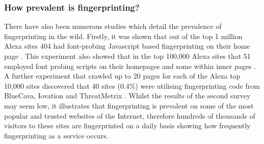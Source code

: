 \documentclass[12pt]{article}
\begin{document}
\subsubsection{How prevalent is fingerprinting?}
There have also been numerous studies which detail the prevalence of fingerprinting in the wild. Firstly, it was shown that out of the top 1 million Alexa sites 404 had font-probing Javascript based fingerprinting on their home page \parencite{dustingFP}. This experiment also showed that in the top 100,000 Alexa sites that 51 employed font probing scripts on their homepages and some within inner pages \parencite{dustingFP}. A further experiment that crawled up to 20 pages for each of the Alexa top 10,000 sites discovered that 40 sites (0.4\%) were utilising fingerprinting code from BlueCava, Iovation and ThreatMetrix \parencite{cookielessMonster}. Whilst the results of the second survey may seem low, it illustrates that fingerprinting is prevalent on some of the most popular and trusted websites of the Internet, therefore hundreds of thousands of visitors to these sites are fingerprinted on a daily basis \parencite{cookielessMonster} showing how frequently fingerprinting as a service occurs.

\end{document}

